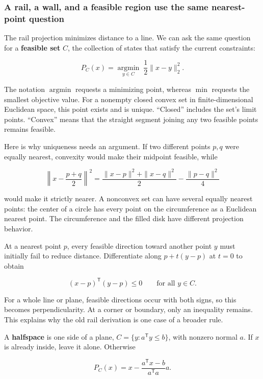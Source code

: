 \subsubsection{A rail, a wall, and a feasible region use the same nearest-point question}\label{01-foundations-i-ch017-a-rail-a-wall-and-a-feasible-region-use-the-same-nearest-point-question}

The rail projection minimizes distance to a line. We can ask the same question for a \textbf{feasible set} \(C\), the collection of states that satisfy the current constraints:

\[
P_C(x)=\underset{y\in C}{\operatorname{argmin}}\;\frac12\|x-y\|_2^2.
\]

The notation \(\operatorname{argmin}\) requests a minimizing point, whereas \(\min\) requests the smallest objective value. For a nonempty closed convex set in finite-dimensional Euclidean space, this point exists and is unique. ``Closed'' includes the set's limit points. ``Convex'' means that the straight segment joining any two feasible points remains feasible.

Here is why uniqueness needs an argument. If two different points \(p,q\) were equally nearest, convexity would make their midpoint feasible, while

\[
\left\|x-\frac{p+q}{2}\right\|^2
=\frac{\|x-p\|^2+\|x-q\|^2}{2}-\frac{\|p-q\|^2}{4}
\]

would make it strictly nearer. A nonconvex set can have several equally nearest points: the center of a circle has every point on the circumference as a Euclidean nearest point. The circumference and the filled disk have different projection behavior.

At a nearest point \(p\), every feasible direction toward another point \(y\) must initially fail to reduce distance. Differentiate along \(p+t(y-p)\) at \(t=0\) to obtain

\[
(x-p)^{\mathsf T}(y-p)\le0\qquad\text{for all }y\in C.
\]

For a whole line or plane, feasible directions occur with both signs, so this becomes perpendicularity. At a corner or boundary, only an inequality remains. This explains why the old rail derivation is one case of a broader rule.

A \textbf{halfspace} is one side of a plane, \(C=\{y:a^{\mathsf T}y\le b\}\), with nonzero normal \(a\). If \(x\) is already inside, leave it alone. Otherwise

\[
P_C(x)=x-\frac{a^{\mathsf T}x-b}{a^{\mathsf T}a}a.
\]

